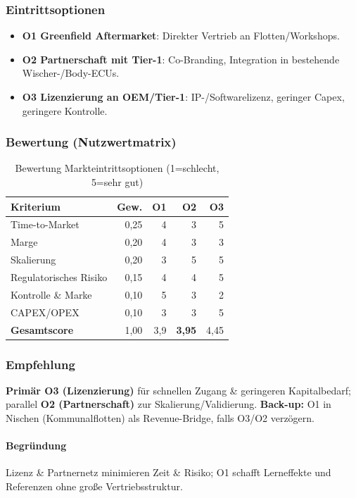 \documentclass[
%
ngerman %
%
numeric %
]{wbh-assignment}
\begin{document}
\vspace*{5mm}

\subsubsection{Eintrittsoptionen}
\begin{itemize}
  \item \textbf{O1 Greenfield Aftermarket}: Direkter Vertrieb an Flotten/Workshops.
  \item \textbf{O2 Partnerschaft mit Tier-1}: Co-Branding, Integration in bestehende Wischer-/Body-ECUs.
  \item \textbf{O3 Lizenzierung an OEM/Tier-1}: IP-/Softwarelizenz, geringer Capex, geringere Kontrolle.
\end{itemize}

\subsubsection{Bewertung (Nutzwertmatrix)}
\begin{table}[htb!]
\centering
\caption{Bewertung Markteintrittsoptionen (1=schlecht, 5=sehr gut)}
\begin{tabular}{l r r r r}
\textbf{Kriterium} & \textbf{Gew.} & \textbf{O1} & \textbf{O2} & \textbf{O3} \\
\hline
Time-to-Market & 0{,}25 & 4 & 3 & 5 \\
Marge & 0{,}20 & 4 & 3 & 3 \\
Skalierung & 0{,}20 & 3 & 5 & 5 \\
Regulatorisches Risiko & 0{,}15 & 4 & 4 & 5 \\
Kontrolle \& Marke & 0{,}10 & 5 & 3 & 2 \\
CAPEX/OPEX & 0{,}10 & 3 & 3 & 5 \\
\hline
\textbf{Gesamtscore} & 1{,}00 & 3{,}9 & \textbf{3{,}95} & 4{,}45 \\
\end{tabular}
\end{table}

\subsubsection{Empfehlung}
\textbf{Primär O3 (Lizenzierung)} für schnellen Zugang \& geringeren Kapitalbedarf; parallel \textbf{O2 (Partnerschaft)} zur Skalierung/Validierung. \textbf{Back-up:} O1 in Nischen (Kommunalflotten) als Revenue-Bridge, falls O3/O2 verzögern.

\paragraph{Begründung}
Lizenz \& Partnernetz minimieren Zeit \& Risiko; O1 schafft Lerneffekte und Referenzen ohne große Vertriebsstruktur.
\end{document}

